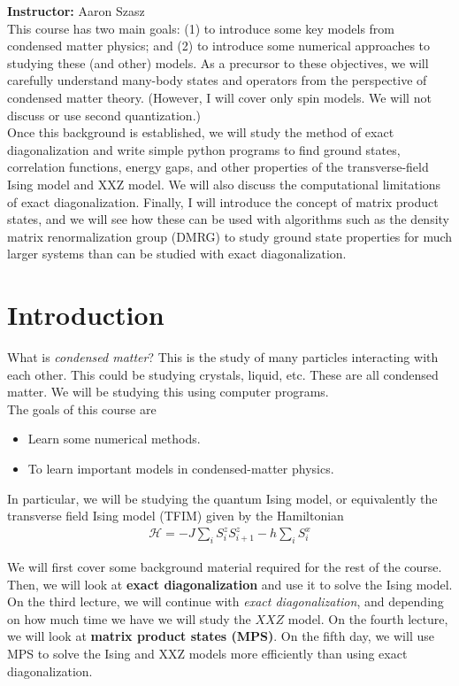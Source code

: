 \documentclass{book}
\theoremstyle{definition}
\newcommand{\had}{\mathcal{H}}
\begin{document}
\textbf{Instructor:} Aaron Szasz\\

This course has two main goals: (1) to introduce some key models from condensed matter physics; and (2) to introduce some numerical approaches to studying these (and other) models.  As a precursor to these objectives, we will carefully understand many-body states and operators from the perspective of condensed matter theory.  (However, I will cover only spin models.  We will not discuss or use second quantization.)\\



Once this background is established, we will study the method of exact diagonalization and write simple python programs to find ground states, correlation functions, energy gaps, and other properties of the transverse-field Ising model and XXZ model.  We will also discuss the computational limitations of exact diagonalization.  Finally, I will introduce the concept of matrix product states, and we will see how these can be used with algorithms such as the density matrix renormalization group (DMRG) to study ground state properties for much larger systems than can be studied with exact diagonalization.


\section{Introduction}

What is \textit{condensed matter}? This is the study of many particles interacting with each other. This could be studying crystals, liquid, etc. These are all condensed matter. We will be studying this using computer programs. \\

The goals of this course are
\begin{itemize}
	\item Learn some numerical methods.
	\item To learn important models in condensed-matter physics.  
\end{itemize}

In particular, we will be studying the quantum Ising model, or equivalently the transverse field Ising model (TFIM) given by the Hamiltonian
\begin{align}
\had = -J \sum_i S^z_i S^z_{i+1} - h \sum_i S^x_i
\end{align}

We will first cover some background material required for the rest of the course. Then, we will look at \textbf{exact diagonalization} and use it to solve the Ising model. On the third lecture, we will continue with \textit{exact diagonalization}, and depending on how much time we have we will study the $XXZ$ model. On the fourth lecture, we will look at \textbf{matrix product states (MPS)}. On the fifth day, we will use MPS to solve the Ising and XXZ models more efficiently than using exact diagonalization.
\end{document}
